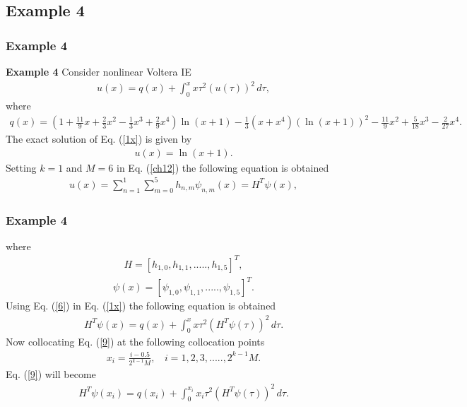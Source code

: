 \documentclass{beamer}
\begin{document}
\subsection*{Example 4}
\begin{frame}\frametitle{Example 4}
	\justifying
\textbf{Example 4} Consider nonlinear Voltera IE \cite{imran1}
\begin{eqnarray}\label{1x}
u(x) = q(x) +\int^x_0x\tau^{2}(u(\tau))^{2}\,d\tau,
\end{eqnarray}
\small
where
\tiny
\begin{eqnarray}\label{2x}
q(x)=(1+\frac{11}{9}x+\frac{2}{3}x^{2}-\frac{1}{3}x^{3}+\frac{2}{9}x^{4})\ln(x+1)-\frac{1}{3}(x+x^{4})(\ln(x+1))^{2}-\frac{11}{9}x^{2}+\frac{5}{18}x^{3}-\frac{2}{27}x^{4}.\nonumber
\end{eqnarray}
\small
The exact solution of Eq. (\ref{1x}) is given by \cite{imran1}
\begin{eqnarray}\label{2x}
u(x)=\ln(x+1).
\end{eqnarray}
\small
Setting $k=1$ and $M=6$ in Eq. (\ref{ch12}) the following equation is obtained
\begin{eqnarray}\label{6}
u(x)=\sum_{n=1}^{1}\sum_{m=0}^{5}h_{n,m}\psi_{n,m}(x)=H^{T}\psi(x),
\end{eqnarray}
\small
\end{frame}
\begin{frame}\frametitle{Example 4}
	\justifying
where
\begin{eqnarray}\label{7}
H=[h_{1,0}, h_{1,1},.....,h_{1,5}]^{T},\nonumber
\end{eqnarray}
\small
\begin{eqnarray}\label{8}
\psi(x)=[\psi_{1,0}, \psi_{1,1}, .....,\psi_{1,5}]^{T}.\nonumber
\end{eqnarray}
\small
Using Eq. (\ref{6}) in Eq. (\ref{1x}) the following equation is obtained
\begin{eqnarray}\label{9}
H^{T}\psi(x)=q(x)+\int^x_0x\tau^{2}(H^{T}\psi(\tau))^{2}\,d\tau.
\end{eqnarray}
\small
Now collocating Eq. (\ref{9}) at the following collocation points
\begin{eqnarray}\label{12}
x_{i}=\frac{i-0.5}{2^{k-1}M},~~~~i=1, 2, 3, .....,2^{k-1}M.
\end{eqnarray}
\small
Eq. (\ref{9}) will become	
\begin{eqnarray}\label{9x}
H^{T}\psi(x_{i})=q(x_{i})+\int^{x_{i}}_{0}x_{i}\tau^{2}(H^{T}\psi(\tau))^{2}\,d\tau.
\end{eqnarray}
\small
\end{frame}
\end{document}
